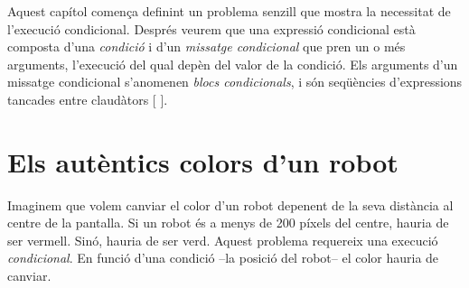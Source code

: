 Aquest capítol comença definint un problema senzill que mostra la necessitat de l'execució condicional. Després veurem que una expressió condicional està composta d'una \emph{condició} i d'un \emph{missatge condicional} que pren un o més arguments, l'execució del qual depèn del valor de la condició. Els arguments d'un missatge condicional s'anomenen \emph{blocs condicionals}, i són seqüències d'expressions tancades entre claudàtors [ ].

\section{Els autèntics colors d'un robot}
Imaginem que volem canviar el color d'un robot depenent de la seva distància al centre de la pantalla. Si un robot és a menys de 200 píxels del centre, hauria de ser vermell. Sinó, hauria de ser verd. Aquest problema requereix una execució \emph{condicional}. En funció d'una condició --la posició del robot-- el color hauria de canviar.

